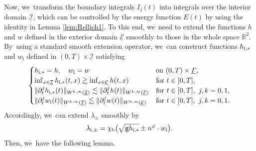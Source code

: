 \documentclass[10pt]{amsart}
\newcommand{\gr}{{\mathtt g}}
\newcommand{\R}{{\mathbb R}}
\newcommand{\dt}{\partial_t}
\newcommand{\cI}{{\mathcal I}}
\newcommand{\cE}{{\mathcal E}}
\newcommand{\ul}[1]{\underline{#1}}
\newcommand{\itGamma}{\mathit{\Gamma}}
\theoremstyle{definition}
\begin{document}
Now, we~transform the boundary integrals $I_j(t)$ into integrals over the interior domain $\ul{\cI}$, which can be controlled by the energy function $E(t)$
by using the identity in Lemma \ref{lem:Rellich1}.
To this end, we~need to extend the functions $h$ and $w$ defined in the exterior domain $\ul{\cE}$ smoothly to those in the whole space $\R^2$. By~using a standard smooth extension operator, we~can construct functions $h_{{\rm i},*}$ and $w_\mathrm{i}$ defined in $(0,T)\times\ul{\cI}$ satisfying
\begin{equation}\label{Ext2}
\begin{cases}
h_{{\rm i},*}=h, \quad w_\mathrm{i}=w &\text{on } (0,T)\times\ul{\itGamma}, \\
\inf_{x\in\ul{\cI}}h_{{\rm i},*}(t,x) \gtrsim \inf_{x\in\ul{\cE}}h(t,x) &\text{for } t\in[0,T], \\
\|\dt^jh_{{\rm i},*}(t)\|_{W^{k,\infty}(\ul{\cI})} \lesssim \|\dt^jh(t)\|_{W^{k,\infty}(\ul{\cE})} &\text{for } t\in[0,T], \ j,k=0,1, \\
\|\dt^jw_\mathrm{i}(t)\|_{W^{k,\infty}(\ul{\cI})} \lesssim \|\dt^jw(t)\|_{W^{k,\infty}(\ul{\cE})} &\text{for } t\in[0,T], \ j,k=0,1.
\end{cases}
\end{equation}
Accordingly, we~can extend $\lambda_{\pm}$ smoothly by
\[
\lambda_{{\rm i},\pm} = \chi_\mathrm{b} \bigl(\sqrt{\gr h_{{\rm i},*}}\pm n^\varphi\cdot w_\mathrm{i} \bigr).
\]
Then, we~have the following lemma.
\end{document}
